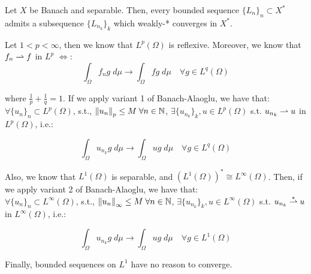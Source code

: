 \begin{ftheorem}
    Let $X$ be Banach and separable. Then, every bounded sequence $\{L_n\}_n \subset X^*$
    admits a subsequence $\{L_{n_k}\}_k$ which weakly-* converges in $X^*$.
\end{ftheorem}

\vspace{1em}

\begin{fexample}
    Let $1 < p < \infty$, then we know that $L^p(\Omega)$ is reflexive. Moreover, we know that
    $f_n \rightharpoonup f$ in $L^p$ $\iff$:
    $$\int_{\Omega} f_n g \; d\mu \to \int_{\Omega} f g \; d\mu \quad \forall g \in L^q(\Omega)$$

    where $\frac{1}{p} + \frac{1}{q} = 1$. If we apply variant 1 of Banach-Alaoglu, we have that:\\
    $\forall \{u_n\}_n \subset L^p(\Omega)$, s.t., $\left\|u_n\right\|_{p} \leq M \; \forall n \in \mathbb{N}$,
    $\exists \{u_{n_k}\}_k , u \in L^p(\Omega)$ s.t. $u_{n_k} \rightharpoonup u$ in $L^p(\Omega)$, i.e.:

    $$\int_{\Omega} u_{n_k} g \; d\mu \to \int_{\Omega} u g \; d\mu \quad \forall g \in L^q(\Omega)$$

    Also, we know that $L^1(\Omega)$ is separable, and $(L^1(\Omega))^* \cong L^{\infty}(\Omega)$.
    Then, if we apply variant 2 of Banach-Alaoglu, we have that:\\
    $\forall \{u_n\}_n \subset L^{\infty}(\Omega)$, s.t., $\left\|u_n\right\|_{\infty} \leq M \; \forall n \in \mathbb{N}$,
    $\exists \{u_{n_k}\}_k , u \in L^{\infty}(\Omega)$ s.t. $u_{n_k} \overset{*}{\rightharpoonup} u$ in $L^{\infty}(\Omega)$, i.e.:

    $$\int_{\Omega} u_{n_k} g \; d\mu \to \int_{\Omega} u g \; d\mu \quad \forall g \in L^1(\Omega)$$

    Finally, bounded sequences on $L^1$ have no reason to converge.
\end{fexample}

